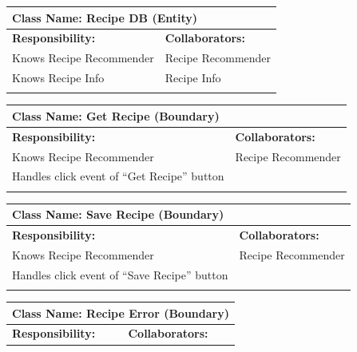 \documentclass[]{article}
\begin{document}
\begin{itemize}
\begin{table}[ht]
		\centering
		\begin{tabular}{|p{6cm}|p{6cm}|}
		\hline 
		\multicolumn{2}{|l|}{\textbf{Class Name: Recipe DB (Entity)}} \\
		\hline
		\textbf{Responsibility:} & \textbf{Collaborators:} \\
		\hline
		Knows Recipe Recommender & Recipe Recommender \\
		Knows Recipe Info & Recipe Info \\
		\vspace{1in} & \\
		\hline
		\end{tabular}
	\end{table}
	\begin{table}[ht]
		\centering
		\begin{tabular}{|p{6cm}|p{6cm}|}
		\hline 
		\multicolumn{2}{|l|}{\textbf{Class Name: Get Recipe (Boundary)}} \\
		\hline
		\textbf{Responsibility:} & \textbf{Collaborators:} \\
		\hline
		Knows Recipe Recommender & Recipe Recommender \\
		Handles click event of “Get Recipe” button & \\  
		\vspace{1in} & \\
		\hline
		\end{tabular}
	\end{table}
	\begin{table}[ht]
		\centering
		\begin{tabular}{|p{6cm}|p{6cm}|}
		\hline 
		\multicolumn{2}{|l|}{\textbf{Class Name: Save Recipe (Boundary)}} \\
		\hline
		\textbf{Responsibility:} & \textbf{Collaborators:} \\
		\hline
		Knows Recipe Recommender & Recipe Recommender \\
		Handles click event of “Save Recipe” button & \\
		\vspace{1in} & \\
		\hline
		\end{tabular}
	\end{table}
	\begin{table}[ht]
		\centering
		\begin{tabular}{|p{6cm}|p{6cm}|}
		\hline 
		\multicolumn{2}{|l|}{\textbf{Class Name: Recipe Error (Boundary)}} \\
		\hline
		\textbf{Responsibility:} & \textbf{Collaborators:} \\

\end{tabular}
\end{table}
\end{itemize}
\end{document}

